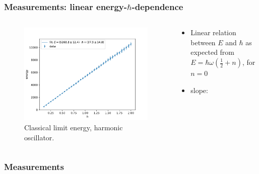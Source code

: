 \documentclass[aspectratio=169]{beamer}
\begin{document}
\begin{frame}
	\frametitle{Measurements: linear energy-$\hbar$-dependence}
	\vspace{-15px}
	\begin{columns}
		\begin{column}{0.6\textwidth}
			\begin{figure}[H]
				\centering
					\includegraphics[width=\textwidth]{../imgs/harmonic_oscillator_classical_limit_energy/harmonic_oscillator_10_classical_limit_energy.pdf}
				\caption{Classical limit energy, harmonic oscillator.}
				\label{fig:harmonic_oscillator_classical_limit_energy}
			\end{figure}
		\end{column}
		\begin{column}{0.39\textwidth}
			\begin{itemize}
				\item Linear relation between $E$ and $\hbar$ as expected from $E = \hbar \omega \left(\frac 12 + n\right)$, for $n = 0$
				\item slope: 
			\end{itemize}
		\end{column}
	\end{columns}
\end{frame}


\begin{frame}
\frametitle{Measurements}

\end{frame}
\end{document}
